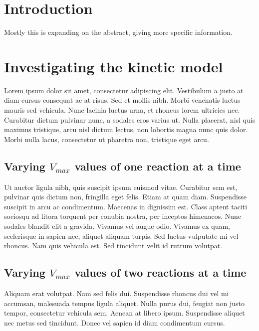 \documentclass[parskip=full]{scrreprt}
\begin{document}
\chapter*{Introduction}
\label{ch:intro}

Mostly this is expanding on the abstract, giving more specific information.

\chapter{Investigating the kinetic model}
\label{ch:kinetic}

Lorem ipsum dolor sit amet, consectetur adipiscing elit. Vestibulum a justo at diam cursus consequat ac at risus. Sed et mollis nibh. Morbi venenatis luctus mauris sed vehicula. Nunc lacinia luctus urna, et rhoncus lorem ultricies nec. Curabitur dictum pulvinar nunc, a sodales eros varius ut. Nulla placerat, nisl quis maximus tristique, arcu nisl dictum lectus, non lobortis magna nunc quis dolor. Morbi nulla lacus, consectetur ut pharetra non, tristique eget arcu.

\section{Varying $V_{max}$ values of one reaction at a time}
\label{sec:onereac}

Ut auctor ligula nibh, quis suscipit ipsum euismod vitae. Curabitur sem est, pulvinar quis dictum non, fringilla eget felis. Etiam at quam diam. Suspendisse suscipit in arcu ac condimentum. Maecenas in dignissim est. Class aptent taciti sociosqu ad litora torquent per conubia nostra, per inceptos himenaeos. Nunc sodales blandit elit a gravida. Vivamus vel augue odio. Vivamus ex quam, scelerisque in sapien nec, aliquet aliquam turpis. Sed luctus vulputate mi vel rhoncus. Nam quis vehicula est. Sed tincidunt velit id rutrum volutpat.

\section{Varying $V_{max}$ values of two reactions at a time}
\label{sec:couples}

Aliquam erat volutpat. Nam sed felis dui. Suspendisse rhoncus dui vel mi accumsan, malesuada tempus ligula aliquet. Nulla purus dui, feugiat non justo tempor, consectetur vehicula sem. Aenean at libero ipsum. Suspendisse aliquet nec metus sed tincidunt. Donec vel sapien id diam condimentum cursus.
\end{document}

